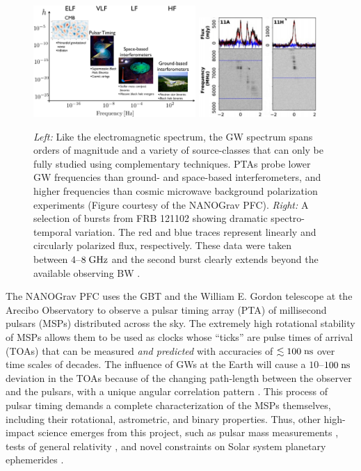 \documentclass[10pt]{myNSF}
\begin{document}
\begin{figure}
  \centering
  \includegraphics[width=0.55\textwidth]{gw_spectrum.png}
  \includegraphics[width=0.4\textwidth]{frb_bursts.png}
  \caption{\emph{Left:} Like the electromagnetic spectrum, the GW
    spectrum spans orders of magnitude and a variety of source-classes
    that can only be fully studied using complementary techniques.
    PTAs probe lower GW frequencies than ground- and space-based
    interferometers, and higher frequencies than cosmic microwave
    background polarization experiments (Figure courtesy of the
    NANOGrav PFC). \emph{Right:} A selection of bursts from FRB 121102
    showing dramatic spectro-temporal variation.  The red and blue
    traces represent linearly and circularly polarized flux,
    respectively.  These data were taken between $4$--$8\; \textrm{GHz}$ and
    the second burst clearly extends beyond the available observing BW
    \cite{gsp+18}. \label{fig:gw_frb}}
\end{figure}

The NANOGrav PFC uses the GBT and the William E. Gordon telescope at
the Arecibo Observatory to observe a pulsar timing array (PTA) of
millisecond pulsars (MSPs) distributed across the sky.  The extremely
high rotational stability of MSPs allows them to be used as clocks
whose ``ticks'' are pulse times of arrival (TOAs) that can be measured
\emph{and predicted} with accuracies of $\lesssim 100\; \textrm{ns}$ over time
scales of decades.  The influence of GWs at the Earth will cause a
$10$--$100\; \textrm{ns}$ deviation in the TOAs because of the changing
path-length between the observer and the pulsars, with a unique
angular correlation pattern \cite{hd83}.  This process of pulsar
timing demands a complete characterization of the MSPs themselves,
including their rotational, astrometric, and binary properties.  Thus,
other high-impact science emerges from this project, such as pulsar
mass measurements \citep{epe+16}, tests of general relativity
\citep{zsd+15}, and novel constraints on Solar system planetary
ephemerides \citep{abb+18}.
\end{document}
